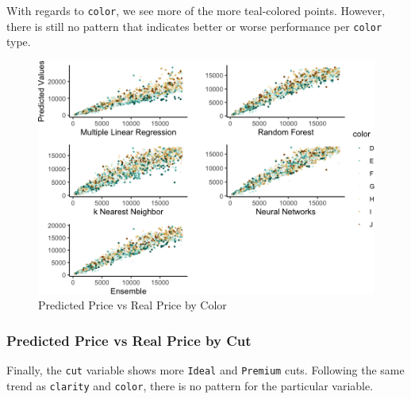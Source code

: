 \documentclass[
  paper=a4,
  ,captions=tableheading
]{scrartcl}
\begin{document}
With regards to \texttt{color}, we see more of the more teal-colored
points. However, there is still no pattern that indicates better or
worse performance per \texttt{color} type.

\begin{figure}[H]

{\centering \includegraphics[width=\linewidth,]{Diamonds_PDF_files/figure-latex/Summ Color Plots-1} 

}

\caption{Predicted Price vs Real Price by Color}\label{fig:Summ Color Plots}
\end{figure}

\newpage

\hypertarget{predicted-price-vs-real-price-by-cut}{%
\subsubsection{Predicted Price vs Real Price by
Cut}\label{predicted-price-vs-real-price-by-cut}}

Finally, the \texttt{cut} variable shows more \texttt{Ideal} and
\texttt{Premium} cuts. Following the same trend as \texttt{clarity} and
\texttt{color}, there is no pattern for the particular variable.
\end{document}
